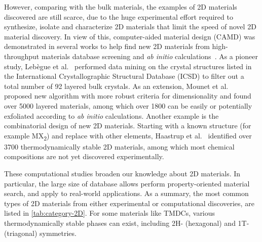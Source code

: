 %
However, comparing with the bulk materials, the examples of 2D
materials discovered are still scarce, due to the huge experimental
effort required to synthesize, isolate and characterize 2D materials
that limit the speed of novel 2D material discovery.
% 
In view of this, computer-aided material design (CAMD) was
demonstrated in several works to help find new 2D materials from
high-throughput materials database screening and \textit{ab initio}
calculations~\autocite{Lebegue_2013_prx,Zhuang_2013_database,Haastrup_2018_database,Mounet_2018_database,Zhou_2019_database}.
%
As a pioneer study, Lebègue et al.~\autocite{Lebegue_2013_prx} performed
data mining on the crystal structures listed in the International
Crystallographic Structural Database (ICSD) to filter out a total
number of 92 layered bulk crystals. As an extension, Mounet et al.~\autocite{Mounet_2018_database}
proposed new algorithm with more robust criteria for dimensionality
and found over 5000 layered materials, among which over 1800 can be
easily or potentially exfoliated according to \textit{ab initio}
calculations.
%
Another example is the combinatorial design of new 2D materials.
Starting with a known structure (for example MX\textsubscript{2}) and
replace with other elements, Haastrup et
al.~\autocite{Haastrup_2018_database} identified over 3700
thermo\-dynamically stable 2D materials, among which most chemical
compositions are not yet discovered experimentally.

These computational studies broaden our knowledge about 2D
materials. In particular, the large size of database allows
perform property-oriented material search, and apply to real-world
applications. As a summary, the most common types of 2D materials from
either experimental or computational discoveries, are listed in
\autoref{tab:category-2D}. For some materials like TMDCs, various
thermo\-dynamically stable phases can exist, including 2H- (hexagonal)
and 1T- (triagonal) symmetries.

